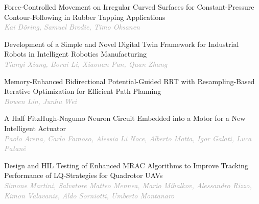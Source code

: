 \begin{multicols*}{2}
\small Force-Controlled Movement on Irregular Curved Surfaces for Constant-Pressure Contour-Following in Rubber Tapping Applications\\ 
\footnotesize \textcolor{darkgray}{\textit{Kai Döring, Samuel  Brodie, Timo  Oksanen}}

\small Development of a Simple and Novel Digital Twin Framework for Industrial Robots in Intelligent Robotics Manufacturing\\ 
\footnotesize \textcolor{darkgray}{\textit{Tianyi Xiang, Borui  Li, Xiaonan  Pan, Quan  Zhang}}

\small Memory-Enhanced Bidirectional Potential-Guided RRT with Resampling-Based Iterative Optimization for Efficient Path Planning\\ 
\footnotesize \textcolor{darkgray}{\textit{Bowen Lin, Junhu  Wei}}

\small A Half FitzHugh-Nagumo Neuron Circuit Embedded into a Motor for a New Intelligent Actuator\\ 
\footnotesize \textcolor{darkgray}{\textit{Paolo Arena, Carlo  Famoso, Alessia  Li Noce, Alberto  Motta, Igor  Galati, Luca  Patanè}}

\small Design and HIL Testing of Enhanced MRAC Algorithms to Improve Tracking Performance of LQ-Strategies for Quadrotor UAVs\\ 
\footnotesize \textcolor{darkgray}{\textit{Simone Martini, Salvatore Matteo  Mennea, Mario  Mihalkov, Alessandro  Rizzo, Kimon  Valavanis, Aldo  Sorniotti, Umberto  Montanaro}}

\end{multicols*}